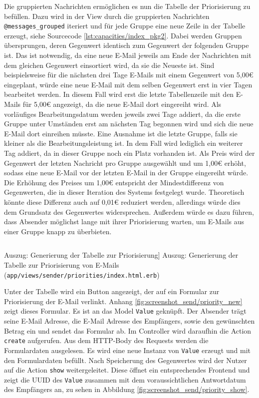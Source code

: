 \noindent Die gruppierten Nachrichten ermöglichen es nun die Tabelle der Priorisierung zu befüllen. Dazu wird in der View durch die gruppierten Nachrichten \texttt{@messages\_grouped} iteriert und für jede Gruppe eine neue Zeile in der Tabelle erzeugt, siehe Sourcecode \ref{lst:capacities/index_pkg2}. Dabei werden Gruppen übersprungen, deren Gegenwert identisch zum Gegenwert der folgenden Gruppe ist. Das ist notwendig, da eine neue E-Mail jeweils am Ende der Nachrichten mit dem gleichen Gegenwert einsortiert wird, da sie die Neueste ist. Sind beispielsweise für die nächsten drei Tage E-Mails mit einem Gegenwert von 5,00€ eingeplant, würde eine neue E-Mail mit dem selben Gegenwert erst in vier Tagen bearbeitet werden. In diesem Fall wird erst die letzte Tabellenzeile mit den E-Mails für 5,00€ angezeigt, da die neue E-Mail dort eingereiht wird. Als vorläufiges Bearbeitungsdatum werden jeweils zwei Tage addiert, da die erste Gruppe unter Umständen erst am nächsten Tag begonnen wird und sich die neue E-Mail dort einreihen müsste. Eine Ausnahme ist die letzte Gruppe, falls sie kleiner als die Bearbeitungsleistung ist. In dem Fall wird lediglich ein weiterer Tag addiert, da in dieser Gruppe noch ein Platz vorhanden ist. Als Preis wird der Gegenwert der letzten Nachricht pro Gruppe ausgewählt und um 1,00€ erhöht, sodass eine neue E-Mail vor der letzten E-Mail in der Gruppe eingereiht würde. Die Erhöhung des Preises um 1,00€ entspricht der Mindestdifferenz von Gegenwerten, die in dieser Iteration des Systems festgelegt wurde. Theoretisch könnte diese Differenz auch auf 0,01€ reduziert werden, allerdings würde dies dem Grundsatz des Gegenwertes widersprechen. Außerdem würde es dazu führen, dass Absender möglichst lange mit ihrer Priorisierung warten, um E-Mails aus einer Gruppe knapp zu überbieten.

\begin{listing}[!ht]
\inputminted[firstline=26, lastline=39, linenos]{erb}{Listings/Pkg2/priorities_index.html.erb}

\caption
    [Auszug: Generierung der Tabelle zur Priorisierung]
    {Auszug: Generierung der Tabelle zur Priorisierung von E-Mails (\texttt{app/views/sender/priorities/index.html.erb})}

\label{lst:capacities/index_pkg2}
\end{listing}

Unter der Tabelle wird ein Button angezeigt, der auf ein Formular zur Priorisierung der E-Mail verlinkt. Anhang \ref{fig:screenshot_send/priority_new} zeigt dieses Formular. Es ist an das Model \texttt{Value} geknüpft. Der Absender trägt seine E-Mail Adresse, die E-Mail Adresse des Empfängers, sowie den gewünschten Betrag ein und sendet das Formular ab. Im Controller wird daraufhin die Action \texttt{create} aufgerufen. Aus dem HTTP-Body des Requests werden die Formulardaten ausgelesen. Es wird eine neue Instanz von \texttt{Value} erzeugt und mit den Formulardaten befüllt. Nach Speicherung des Gegenwertes wird der Nutzer auf die Action \texttt{show} weitergeleitet. Diese öffnet ein entsprechendes Frontend und zeigt die UUID des \texttt{Value} zusammen mit dem voraussichtlichen Antwortdatum des Empfängers an, zu sehen in Abbildung \ref{fig:screenshot_send/priority_show}.

